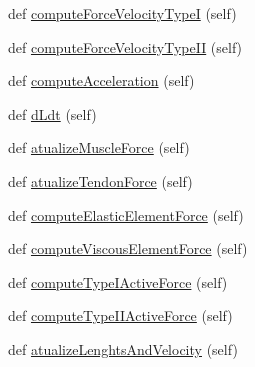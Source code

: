 \begin{DoxyCompactItemize}
\item 
def \hyperlink{classjoint_ankle_position_task_1_1joint_ankle_position_task_ac818fceec418d671b8d5cb612497aaf2}{compute\+Force\+Velocity\+TypeI} (self)
\item 
def \hyperlink{classjoint_ankle_position_task_1_1joint_ankle_position_task_adda3990fdbbabbd4d8a75360f04735a6}{compute\+Force\+Velocity\+Type\+II} (self)
\item 
def \hyperlink{classjoint_ankle_position_task_1_1joint_ankle_position_task_ad8631689c974c67860cee97b7b13b25f}{compute\+Acceleration} (self)
\item 
def \hyperlink{classjoint_ankle_position_task_1_1joint_ankle_position_task_af986604f62091b3f82dbd6a2b888a223}{d\+Ldt} (self)
\item 
def \hyperlink{classjoint_ankle_position_task_1_1joint_ankle_position_task_af856343e3fce71b7debc3a538922d856}{atualize\+Muscle\+Force} (self)
\item 
def \hyperlink{classjoint_ankle_position_task_1_1joint_ankle_position_task_abcd95d655b19278aaeccb2f56fafddaf}{atualize\+Tendon\+Force} (self)
\item 
def \hyperlink{classjoint_ankle_position_task_1_1joint_ankle_position_task_a2fe373956414f18b74dcb4c6aaa91388}{compute\+Elastic\+Element\+Force} (self)
\item 
def \hyperlink{classjoint_ankle_position_task_1_1joint_ankle_position_task_ae2cbbf86c72289ac5af730e91c862925}{compute\+Viscous\+Element\+Force} (self)
\item 
def \hyperlink{classjoint_ankle_position_task_1_1joint_ankle_position_task_ae4566e7ea50dd52279d5fdcb3aa3da5e}{compute\+Type\+I\+Active\+Force} (self)
\item 
def \hyperlink{classjoint_ankle_position_task_1_1joint_ankle_position_task_ac196595126ed1735a9ae693a5b16283f}{compute\+Type\+I\+I\+Active\+Force} (self)
\item 
def \hyperlink{classjoint_ankle_position_task_1_1joint_ankle_position_task_ac044fc7d615fc19a0f90e6af4947c32e}{atualize\+Lenghts\+And\+Velocity} (self)
\end{DoxyCompactItemize}

